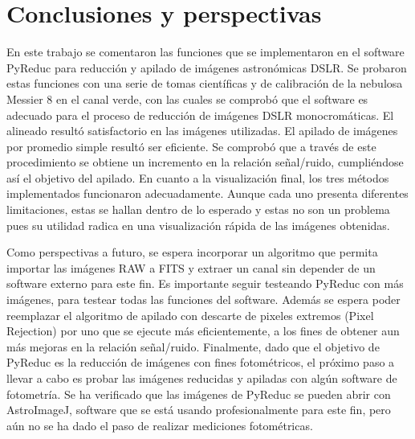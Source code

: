 \documentclass[a4paper, 12pt]{article}
\begin{document}
\section{Conclusiones y perspectivas}
En este trabajo se comentaron las funciones que se implementaron en el software PyReduc para reducción y apilado de imágenes astronómicas DSLR. Se probaron estas funciones con una serie de tomas científicas y de calibración de la nebulosa Messier 8 en el canal verde, con las cuales se comprobó que el software es adecuado para el proceso de reducción de imágenes DSLR monocromáticas. El alineado resultó satisfactorio en las imágenes utilizadas. El apilado de imágenes por promedio simple resultó ser eficiente. Se comprobó que a través de este procedimiento se obtiene un incremento en la relación señal/ruido, cumpliéndose así el objetivo del apilado.
En cuanto a la visualización final, los tres métodos implementados funcionaron adecuadamente. Aunque cada uno presenta diferentes limitaciones, estas se hallan dentro de lo esperado y estas no son un problema pues su utilidad radica en una visualización rápida de las imágenes obtenidas.

Como perspectivas a futuro, se espera incorporar un algoritmo que permita importar las imágenes RAW a FITS y extraer un canal sin depender de un software externo para este fin. Es importante seguir testeando PyReduc con más imágenes, para testear todas las funciones del software. Además se espera poder reemplazar el algoritmo de apilado con descarte de pixeles extremos (Pixel Rejection) por uno que se ejecute más eficientemente, a los fines de obtener aun más mejoras en la relación señal/ruido. Finalmente, dado que el objetivo de PyReduc es la reducción de imágenes con fines fotométricos, el próximo paso a llevar a cabo es probar las imágenes reducidas y apiladas con algún software de fotometría. Se ha verificado que las imágenes de PyReduc se pueden abrir con AstroImageJ, software que se está usando profesionalmente para este fin, pero aún no se ha dado el paso de realizar mediciones fotométricas.

   
\end{document}
